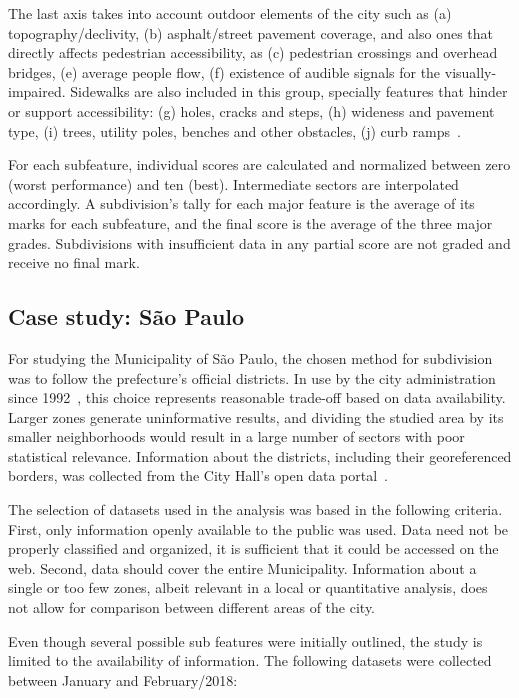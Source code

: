\documentclass[12pt]{article}
\begin{document}
The last axis takes into account outdoor elements of the city such as
(a) topography/declivity,
(b) asphalt/street pavement coverage,
and also ones that directly affects pedestrian accessibility, as
(c) pedestrian crossings and overhead bridges,
(e) average people flow,
(f) existence of audible signals for the visually-impaired.
Sidewalks are also included in this group, specially features that hinder or support accessibility:
(g) holes, cracks and steps,
(h) wideness and pavement type,
(i) trees, utility poles, benches and other obstacles,
(j) curb ramps~\cite{church-marston, mackett2008amelia}.

For each subfeature, individual scores are calculated and normalized
between zero (worst performance) and ten (best).
Intermediate sectors are interpolated accordingly.
A subdivision's tally for each major feature is the average of its marks for each subfeature,
and the final score is the average of the three major grades.
Subdivisions with insufficient data in any partial score
are not graded and receive no final mark.

\subsection{Case study: São Paulo}
\label{sub:meth-saopaulo}
For studying the Municipality of São Paulo,
the chosen method for subdivision was to follow the prefecture's official districts.
In use by the city administration since 1992~\cite{lei-distritos},
this choice represents reasonable trade-off based on data availability.
Larger zones generate uninformative results,
and dividing the studied area by its smaller neighborhoods would result in a large number of sectors with poor statistical relevance.
Information about the districts, including their georeferenced borders,
was collected from the City Hall's open data portal~\cite{geosampa:2000}.

The selection of datasets used in the analysis was based in the following criteria.
First, only information openly available to the public was used.
Data need not be properly classified and organized,
it is sufficient that it could be accessed on the web.
Second, data should cover the entire Municipality.
Information about a single or too few zones,
albeit relevant in a local or quantitative analysis,
does not allow for comparison between different areas of the city.

Even though several possible sub features were initially outlined,
the study is limited to the availability of information.
The following datasets were collected between January and February/2018:
\end{document}
